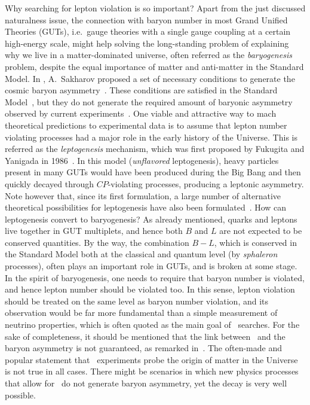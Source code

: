 Why searching for lepton violation is so important? Apart from the just discussed
naturalness issue, the connection with baryon number in most Grand Unified Theories
(GUTs), i.e.~gauge theories with a single gauge coupling at a certain high-energy scale,
might help solving the long-standing problem of explaining why we live in a
matter-dominated universe, often referred as the \emph{baryogenesis} problem, despite the
equal importance of matter and anti-matter in the Standard Model.  In ,
A.~Sakharov proposed a set of necessary conditions to generate the cosmic baryon
asymmetry~\cite{Sakharov1991}.  These conditions are satisfied in the Standard
Model~\cite{Buchmuller2005}, but they do not generate the required amount of baryonic
asymmetry observed by current experiments~\cite{Zyla2020, Aghanim2018}.  One viable and
attractive way to mach theoretical predictions to experimental data is to assume that
lepton number violating processes had a major role in the early history of the Universe.
This is referred as the \emph{leptogenesis} mechanism, which was first proposed by
Fukugita and Yanigada in 1986~\cite{Fukugita1986}. In this model (\emph{unflavored}
leptogenesis), heavy particles present in many GUTs would have been produced during the Big
Bang and then quickly decayed through $CP$-violating processes, producing a leptonic
asymmetry. Note however that, since its first formulation, a large number of alternative
theoretical possibilities for leptogenesis have also been
formulated~\cite{Buchmuller2005}.  How can leptogenesis convert to baryogenesis? As
already mentioned, quarks and leptons live together in GUT multiplets, and hence both $B$
and $L$ are not expected to be conserved quantities. By the way, the combination $B−L$,
which is conserved in the Standard Model both at the classical and quantum level (by
\emph{sphaleron} processes), often plays an important role in GUTs, and is broken at some
stage.  In the spirit of baryogenesis, one needs to require that baryon number is
violated, and hence lepton number should be violated too. In this sense, lepton violation
should be treated on the same level as baryon number violation, and its observation would
be far more fundamental than a simple measurement of neutrino properties, which is often
quoted as the main goal of \onbb\ searches.  For the sake of completeness, it should be
mentioned that the link between \onbb\ and the baryon asymmetry is not guaranteed, as
remarked in~\cite{Rodejohann2011}. The often-made and popular statement that \onbb\
experiments probe the origin of matter in the Universe is not true in all cases. There
might be scenarios in which new physics processes that allow for \onbb\ do not generate
baryon asymmetry, yet the decay is very well possible.

